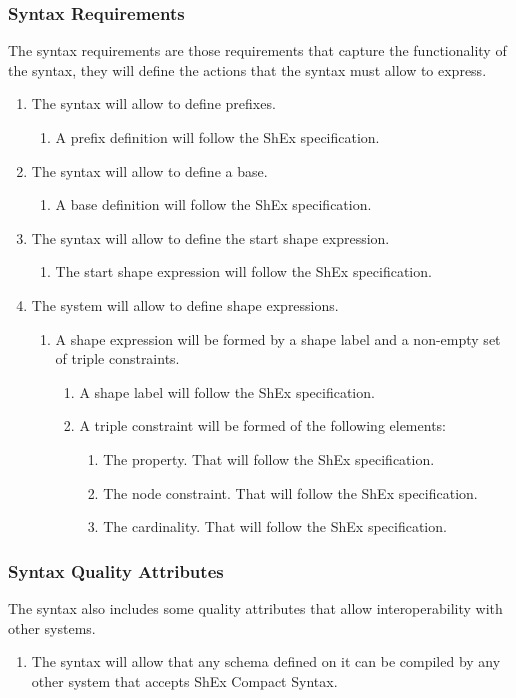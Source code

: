 \subsubsection{Syntax Requirements}
The syntax requirements are those requirements that capture the functionality of the syntax, they will define
the actions that the syntax must allow to express.

\begin{enumerate}
    \item The syntax will allow to define prefixes.
    \begin{enumerate}
        \item A prefix definition will follow the ShEx specification.
    \end{enumerate}
    \item The syntax will allow to define a base.
    \begin{enumerate}
        \item A base definition will follow the ShEx specification.
    \end{enumerate}
    \item The syntax will allow to define the start shape expression.
    \begin{enumerate}
        \item The start shape expression will follow the ShEx specification.
    \end{enumerate}
    \item The system will allow to define shape expressions.
    \begin{enumerate}
        \item A shape expression will be formed by a shape label and a non-empty set of triple constraints.
        \begin{enumerate}
            \item A shape label will follow the ShEx specification.
            \item A triple constraint will be formed of the following elements:
            \begin{enumerate}
                \item The property. That will follow the ShEx specification.
                \item The node constraint. That will follow the ShEx specification.
                \item The cardinality. That will follow the ShEx specification.
            \end{enumerate}
        \end{enumerate}
    \end{enumerate}
\end{enumerate}

\subsubsection{Syntax Quality Attributes}
The syntax also includes some quality attributes that allow interoperability with other systems.
\begin{enumerate}
    \item The syntax will allow that any schema defined on it can be compiled by any other system that accepts ShEx Compact Syntax.
\end{enumerate}